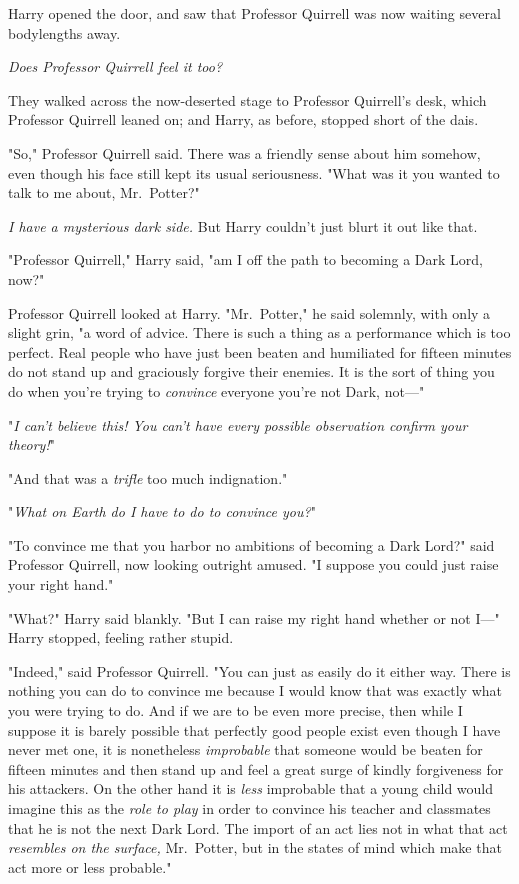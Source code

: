 Harry opened the door, and saw that Professor Quirrell was now waiting several 
bodylengths away.

\emph{Does Professor Quirrell feel it too?}

They walked across the now-deserted stage to Professor Quirrell's desk, which 
Professor Quirrell leaned on; and Harry, as before, stopped short of the dais.

"So," Professor Quirrell said. There was a friendly sense about him somehow, 
even though his face still kept its usual seriousness. "What was it you wanted 
to talk to me about, Mr.~Potter?"

\emph{I have a mysterious dark side.} But Harry couldn't just blurt it out like 
that.

"Professor Quirrell," Harry said, "am I off the path to becoming a Dark Lord, 
now?"

Professor Quirrell looked at Harry. "Mr.~Potter," he said solemnly, with only a 
slight grin, "a word of advice. There is such a thing as a performance which is 
too perfect. Real people who have just been beaten and humiliated for fifteen 
minutes do not stand up and graciously forgive their enemies. It is the sort of 
thing you do when you're trying to \emph{convince} everyone you're not Dark, 
not---"

"\emph{I can't believe this! You can't have every possible observation confirm 
your theory!}"

"And that was a \emph{trifle} too much indignation."

"\emph{What on Earth do I have to do to convince you?}"

"To convince me that you harbor no ambitions of becoming a Dark Lord?" said 
Professor Quirrell, now looking outright amused. "I suppose you could just 
raise your right hand."

"What?" Harry said blankly. "But I can raise my right hand whether or not I---" 
Harry stopped, feeling rather stupid.

"Indeed," said Professor Quirrell. "You can just as easily do it either way. 
There is nothing you can do to convince me because I would know that was 
exactly what you were trying to do. And if we are to be even more precise, then 
while I suppose it is barely possible that perfectly good people exist even 
though I have never met one, it is nonetheless \emph{improbable} that someone 
would be beaten for fifteen minutes and then stand up and feel a great surge of 
kindly forgiveness for his attackers. On the other hand it is \emph{less} 
improbable that a young child would imagine this as the \emph{role to play} in 
order to convince his teacher and classmates that he is not the next Dark Lord. 
The import of an act lies not in what that act \emph{resembles on the surface,} 
Mr.~Potter, but in the states of mind which make that act more or less 
probable."

